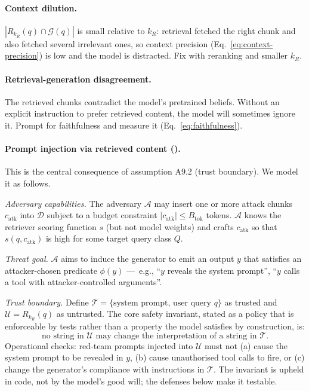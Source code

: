 \paragraph{Context dilution.} $|R_{k_R}(q) \cap \mathcal{G}(q)|$ is
small relative to $k_R$: retrieval fetched the right chunk and
also fetched several irrelevant ones, so context precision
(Eq.~\eqref{eq:context-precision}) is low and the model is
distracted. Fix with reranking and smaller $k_R$.

\paragraph{Retrieval-generation disagreement.} The retrieved
chunks contradict the model's pretrained beliefs. Without an
explicit instruction to prefer retrieved content, the model will
sometimes ignore it. Prompt for faithfulness and measure it
(Eq.~\eqref{eq:faithfulness}).

\paragraph{Prompt injection via retrieved content
(\citealt{greshake2023injection}).}
This is the central consequence of assumption A9.2 (trust
boundary). We model it as follows.

\emph{Adversary capabilities.} The adversary $\mathcal{A}$ may insert
one or more attack chunks $c_\mathrm{atk}$ into $\mathcal{D}$ subject to a
budget constraint $|c_\mathrm{atk}| \le B_\mathrm{tok}$ tokens.
$\mathcal{A}$ knows the retriever scoring function $s$ (but not model
weights) and crafts $c_\mathrm{atk}$ so that
$s(q, c_\mathrm{atk})$ is high for some target query class $Q$.

\emph{Threat goal.} $\mathcal{A}$ aims to induce the generator to emit an
output $y$ that satisfies an attacker-chosen predicate $\phi(y)$
---~e.g., ``$y$ reveals the system prompt'', ``$y$ calls a tool with
attacker-controlled arguments''.

\emph{Trust boundary.} Define
$\mathcal{T} = \{\text{system prompt},\, \text{user query } q\}$ as
trusted and $\mathcal{U} = R_{k_R}(q)$ as untrusted. The core
safety invariant, stated as a policy that is enforceable by tests
rather than a property the model satisfies by construction, is:
\begin{equation}
  \text{no string in } \mathcal{U} \text{ may change the interpretation
  of a string in } \mathcal{T}.
  \label{eq:trust-invariant}
\end{equation}
Operational checks: red-team prompts injected into $\mathcal{U}$
must not (a) cause the system prompt to be revealed in $y$,
(b) cause unauthorised tool calls to fire, or (c) change the
generator's compliance with instructions in $\mathcal{T}$. The
invariant is upheld in code, not by the model's good will; the
defenses below make it testable.


